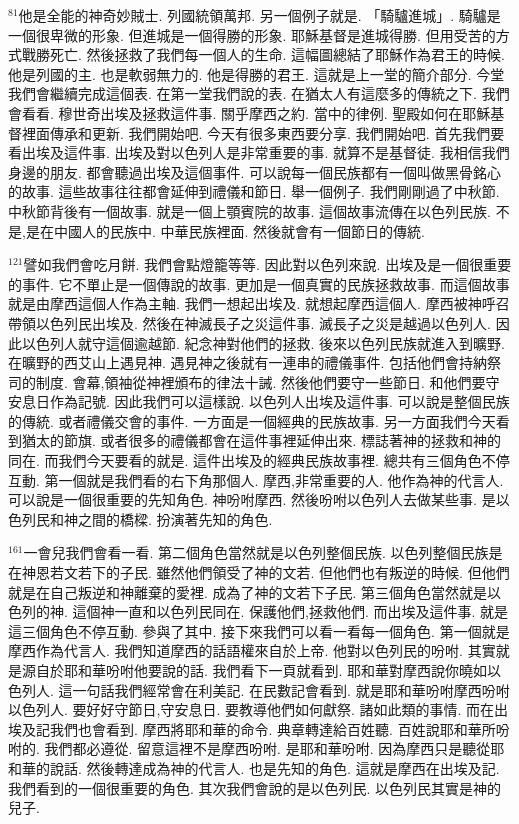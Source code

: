 \documentclass{book}
\begin{document}
$^{81}$他是全能的神奇妙賊士.
列國統領萬邦.
另一個例子就是.
「騎驢進城」.
騎驢是一個很卑微的形象.
但進城是一個得勝的形象.
耶穌基督是進城得勝.
但用受苦的方式戰勝死亡.
然後拯救了我們每一個人的生命.
這幅圖總結了耶穌作為君王的時候.
他是列國的主.
也是軟弱無力的.
他是得勝的君王.
這就是上一堂的簡介部分.
今堂我們會繼續完成這個表.
在第一堂我們說的表.
在猶太人有這麼多的傳統之下.
我們會看看.
穆世奇出埃及拯救這件事.
關乎摩西之約.
當中的律例.
聖殿如何在耶穌基督裡面傳承和更新.
我們開始吧.
今天有很多東西要分享.
我們開始吧.
首先我們要看出埃及這件事.
出埃及對以色列人是非常重要的事.
就算不是基督徒.
我相信我們身邊的朋友.
都會聽過出埃及這個事件.
可以說每一個民族都有一個叫做黑骨銘心的故事.
這些故事往往都會延伸到禮儀和節日.
舉一個例子.
我們剛剛過了中秋節.
中秋節背後有一個故事.
就是一個上顎賓院的故事.
這個故事流傳在以色列民族.
不是,是在中國人的民族中.
中華民族裡面.
然後就會有一個節日的傳統.

$^{121}$譬如我們會吃月餅.
我們會點燈籠等等.
因此對以色列來說.
出埃及是一個很重要的事件.
它不單止是一個傳說的故事.
更加是一個真實的民族拯救故事.
而這個故事就是由摩西這個人作為主軸.
我們一想起出埃及.
就想起摩西這個人.
摩西被神呼召帶領以色列民出埃及.
然後在神滅長子之災這件事.
滅長子之災是越過以色列人.
因此以色列人就守這個逾越節.
紀念神對他們的拯救.
後來以色列民族就進入到曠野.
在曠野的西艾山上遇見神.
遇見神之後就有一連串的禮儀事件.
包括他們會持納祭司的制度.
會幕,領袖從神裡頒布的律法十誡.
然後他們要守一些節日.
和他們要守安息日作為記號.
因此我們可以這樣說.
以色列人出埃及這件事.
可以說是整個民族的傳統.
或者禮儀交會的事件.
一方面是一個經典的民族故事.
另一方面我們今天看到猶太的節旗.
或者很多的禮儀都會在這件事裡延伸出來.
標誌著神的拯救和神的同在.
而我們今天要看的就是.
這件出埃及的經典民族故事裡.
總共有三個角色不停互動.
第一個就是我們看的右下角那個人.
摩西,非常重要的人.
他作為神的代言人.
可以說是一個很重要的先知角色.
神吩咐摩西.
然後吩咐以色列人去做某些事.
是以色列民和神之間的橋樑.
扮演著先知的角色.

$^{161}$一會兒我們會看一看.
第二個角色當然就是以色列整個民族.
以色列整個民族是在神恩若文若下的子民.
雖然他們領受了神的文若.
但他們也有叛逆的時候.
但他們就是在自己叛逆和神離棄的愛裡.
成為了神的文若下子民.
第三個角色當然就是以色列的神.
這個神一直和以色列民同在.
保護他們,拯救他們.
而出埃及這件事.
就是這三個角色不停互動.
參與了其中.
接下來我們可以看一看每一個角色.
第一個就是摩西作為代言人.
我們知道摩西的話語權來自於上帝.
他對以色列民的吩咐.
其實就是源自於耶和華吩咐他要說的話.
我們看下一頁就看到.
耶和華對摩西說你曉如以色列人.
這一句話我們經常會在利美記.
在民數記會看到.
就是耶和華吩咐摩西吩咐以色列人.
要好好守節日,守安息日.
要教導他們如何獻祭.
諸如此類的事情.
而在出埃及記我們也會看到.
摩西將耶和華的命令.
典章轉達給百姓聽.
百姓說耶和華所吩咐的.
我們都必遵從.
留意這裡不是摩西吩咐.
是耶和華吩咐.
因為摩西只是聽從耶和華的說話.
然後轉達成為神的代言人.
也是先知的角色.
這就是摩西在出埃及記.
我們看到的一個很重要的角色.
其次我們會說的是以色列民.
以色列民其實是神的兒子.
\end{document}
